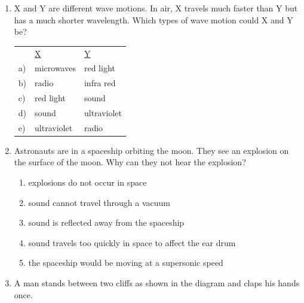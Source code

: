 \begin{eocexercises}{}
\begin{enumerate}
\item X and Y are different wave motions. In air, X travels much faster than Y but has a much shorter wavelength. Which types of wave motion could X and Y be?

\begin{tabular}{lll}
& \underline{X} & \underline{Y}\\
a) & microwaves & red light\\
b) & radio & infra red\\
c) & red light & sound\\
d) & sound & ultraviolet\\
e) & ultraviolet & radio\\
\end{tabular}

\item Astronauts are in a spaceship orbiting the moon. They see an explosion on the surface of the moon. Why can they not hear the explosion?
\begin{enumerate}[label=\textbf{\alph*}.]
\item explosions do not occur in space
\item sound cannot travel through a vacuum
\item sound is reflected away from the spaceship
\item sound travels too quickly in space to affect the ear drum
\item the spaceship would be moving at a supersonic speed
\end{enumerate}

\item A man stands between two cliffs as shown in the diagram and claps his hands once.


\end{enumerate}
\end{eocexercises}
